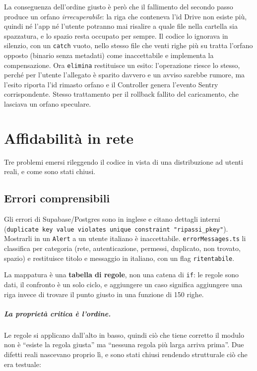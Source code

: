 \documentclass[11pt,a4paper]{report}
\begin{document}
La conseguenza dell'ordine giusto \`e per\`o che il fallimento del secondo
passo produce un orfano \emph{irrecuperabile}: la riga che conteneva l'id
Drive non esiste pi\`u, quindi n\'e l'app n\'e l'utente potranno mai risalire
a quale file nella cartella sia spazzatura, e lo spazio resta occupato per
sempre. Il codice lo ignorava in silenzio, con un \texttt{catch} vuoto, nello
stesso file che venti righe pi\`u su tratta l'orfano opposto (binario senza
metadati) come inaccettabile e implementa la compensazione. Ora
\texttt{elimina} restituisce un esito: l'operazione riesce lo stesso, perch\'e
per l'utente l'allegato \`e sparito davvero e un avviso sarebbe rumore, ma
l'esito riporta l'id rimasto orfano e il Controller genera l'evento Sentry
corrispondente. Stesso trattamento per il rollback fallito del caricamento,
che lasciava un orfano speculare.

\chapter{Affidabilit\`a in rete}

Tre problemi emersi rileggendo il codice in vista di una distribuzione ad
utenti reali, e come sono stati chiusi.

\section{Errori comprensibili}
\label{sec:errori}

Gli errori di Supabase/Postgres sono in inglese e citano dettagli interni
(\texttt{duplicate key value violates unique constraint "ripassi\_pkey"}).
Mostrarli in un \texttt{Alert} a un utente italiano \`e inaccettabile.
\texttt{errorMessages.ts} li classifica per categoria (rete, autenticazione,
permessi, duplicato, non trovato, spazio) e restituisce titolo e messaggio in
italiano, con un flag \texttt{ritentabile}.

La mappatura \`e una \textbf{tabella di regole}, non una catena di \texttt{if}:
le regole sono dati, il confronto \`e un solo ciclo, e aggiungere un caso
significa aggiungere una riga invece di trovare il punto giusto in una
funzione di 150 righe.

\paragraph{La proprietà critica \`e l'ordine.} Le regole si applicano dall'alto
in basso, quindi ci\`o che tiene corretto il modulo non \`e ``esiste la regola
giusta'' ma ``nessuna regola pi\`u larga arriva prima''. Due difetti reali
nascevano proprio l\`i, e sono stati chiusi rendendo strutturale ci\`o che era
testuale:
\end{document}
